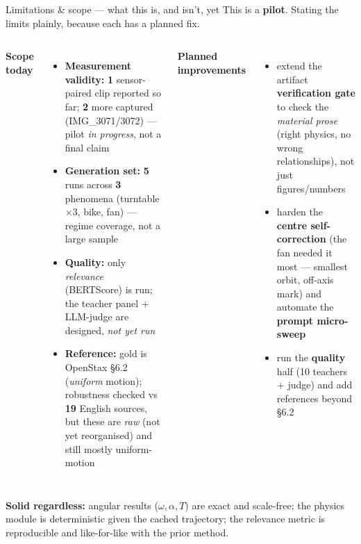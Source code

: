 \documentclass[aspectratio=169,10pt]{beamer}
\newcommand{\hl}[1]{{\bfseries\color{cAccent}#1}}
\begin{document}
\begin{frame}{Limitations \& scope --- what this is, and isn't, yet}
\small This is a \hl{pilot}. Stating the limits plainly, because each has a planned fix.
\vspace{0.4em}
\begin{columns}[T]
{\footnotesize\textbf{\color{cAccent}Scope today}}
\begin{itemize}\setlength\itemsep{2pt}\footnotesize
  \item \textbf{Measurement validity:} \hl{1} sensor-paired clip reported so far; \hl{2} more captured (IMG\_3071/3072) --- pilot \emph{in progress}, not a final claim
  \item \textbf{Generation set:} \hl{5} runs across \hl{3} phenomena (turntable\,$\times$3, bike, fan) --- regime coverage, not a large sample
  \item \textbf{Quality:} only \emph{relevance} (BERTScore) is run; the teacher panel + LLM-judge are designed, \emph{not yet run}
  \item \textbf{Reference:} gold is OpenStax \S6.2 (\emph{uniform} motion); robustness checked vs \hl{19} English sources, but these are \emph{raw} (not yet reorganised) and still mostly uniform-motion
\end{itemize}
{\footnotesize\textbf{\color{cMeas}Planned improvements}}
\begin{itemize}\setlength\itemsep{2pt}\footnotesize
  \item extend the artifact \textbf{verification gate} to check the \emph{material prose} (right physics, no wrong relationships), not just figures/numbers
  \item harden the \textbf{centre self-correction} (the fan needed it most --- smallest orbit, off-axis mark) and automate the \textbf{prompt micro-sweep}
  \item run the \textbf{quality} half (10 teachers + judge) and add references beyond \S6.2
\end{itemize}
\end{columns}
\vspace{0.4em}
{\scriptsize \textbf{Solid regardless:} angular results ($\omega,\alpha,T$) are exact and scale-free; the physics module is deterministic given the cached trajectory; the relevance metric is reproducible and like-for-like with the prior method.}
\end{frame}
\end{document}
